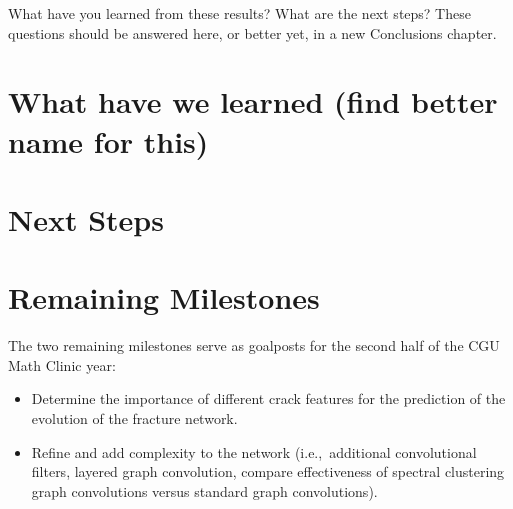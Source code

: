 
{\color{red}What have you learned from these results?  What are the next steps? These questions should be answered here, or better yet, in a new Conclusions chapter.}

\section{What have we learned (find better name for this)}


\section{Next Steps }


\section{Remaining Milestones}
The two remaining milestones serve as goalposts for the second half of the CGU Math Clinic year:
\begin{itemize}
\item Determine the importance of different crack features for the prediction of the evolution of the fracture network.
\item Refine and add complexity to the network (i.e.,\ additional convolutional filters, layered graph convolution, compare effectiveness of spectral clustering graph convolutions versus standard graph convolutions).
\end{itemize}



